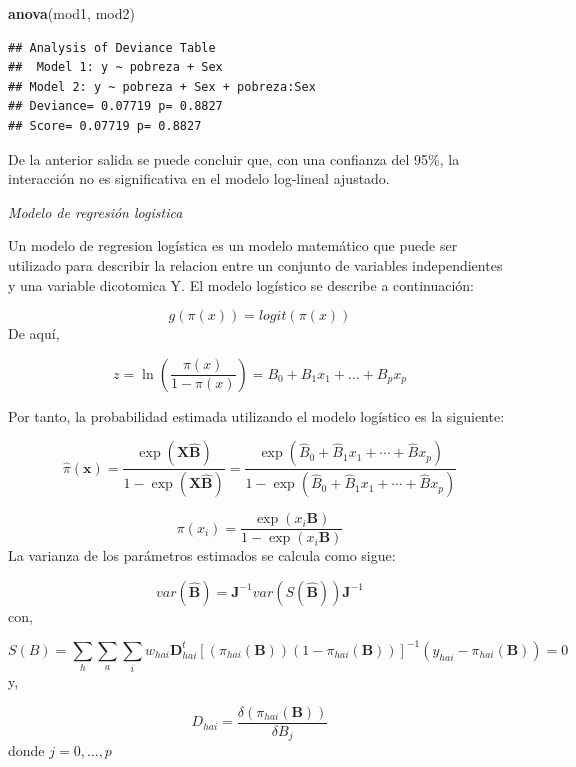 \documentclass[
  12pt,
]{book}
\newenvironment{Shaded}{\begin{snugshade}}{\end{snugshade}}
\newcommand{\FunctionTok}[1]{\textcolor[rgb]{0.13,0.29,0.53}{\textbf{#1}}}
\newcommand{\NormalTok}[1]{#1}
\begin{document}
\begin{Shaded}
\begin{Highlighting}[]
\FunctionTok{anova}\NormalTok{(mod1, mod2)}
\end{Highlighting}
\end{Shaded}

\begin{verbatim}
## Analysis of Deviance Table
##  Model 1: y ~ pobreza + Sex
## Model 2: y ~ pobreza + Sex + pobreza:Sex 
## Deviance= 0.07719 p= 0.8827 
## Score= 0.07719 p= 0.8827
\end{verbatim}

De la anterior salida se puede concluir que, con una confianza del 95\%, la interacción no es significativa en el modelo log-lineal ajustado.

\emph{Modelo de regresión logistica}

Un modelo de regresion logística es un modelo matemático que puede ser utilizado para describir la relacion entre un conjunto de variables independientes y una variable dicotomica Y. El modelo logístico se describe a continuación:

\[
    g(\pi(x))=logit(\pi(x)) 
\]
De aquí,

\[
z = \ln\left(\frac{\pi(x)}{1-\pi(x)}\right) = B_0 + B_1x_1+\dots+B_px_p
\]

Por tanto, la probabilidad estimada utilizando el modelo logístico es la siguiente:

\[
    \hat{\pi}\left(\boldsymbol{x}\right)=\frac{\exp\left(\boldsymbol{X\hat{B}}\right)}{1-\exp\left(\boldsymbol{X\hat{B}}\right)}=\frac{\exp\left(\hat{B}_{0}+\hat{B}_{1}x_{1}+\cdots+\hat{B}x_{p}\right)}{1-\exp\left(\hat{B}_{0}+\hat{B}_{1}x_{1}+\cdots+\hat{B}x_{p}\right)}
\]

\[
    \pi\left(x_{i}\right)=\frac{\exp\left(x_{i}\boldsymbol{B}\right)}{1-\exp\left(x_{i}\boldsymbol{B}\right)}
\]
La varianza de los parámetros estimados se calcula como sigue:

\[
    var\left(\boldsymbol{\hat{B}}\right)=\boldsymbol{J}^{-1}var\left(S\left(\hat{\boldsymbol{B}}\right)\right)\boldsymbol{J}^{-1}
\]
con,

\[
    S\left(B\right)=\sum_{h}\sum_{a}\sum_{i}w_{hai}\boldsymbol{D}_{hai}^{t}\left[\left(\pi_{hai}\left(\boldsymbol{B}\right)\right)\left(1-\pi_{hai}\left(\boldsymbol{B}\right)\right)\right]^{-1}\left(y_{hai}-\pi_{hai}\left(\boldsymbol{B}\right)\right)=0
\]
y,

\[
    D_{hai} = \frac{\delta\left(\pi_{hai}\left(\boldsymbol{B}\right)\right)}{\delta B_{j}}
\]
donde \(j=0,\dots,p\)
\end{document}
